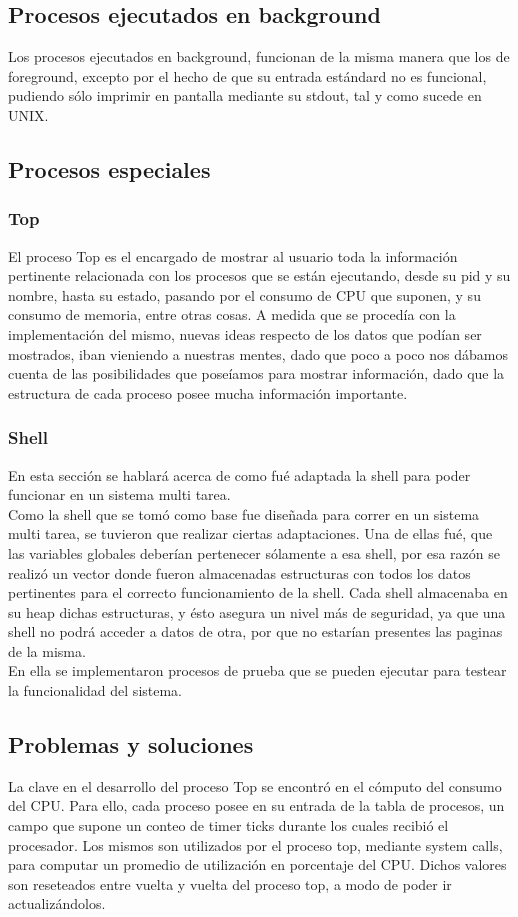 \documentclass[10pt,a4paper]{article}
\begin{document}
	\subsection{Procesos ejecutados en background}
		Los procesos ejecutados en background, funcionan de la misma manera que los de foreground, excepto por el hecho de que su entrada est\'andard no es funcional, pudiendo s\'olo imprimir en pantalla mediante su stdout, tal y como sucede en UNIX.
	\subsection{Procesos especiales}
	\subsubsection{Top}
		El proceso Top es el encargado de mostrar al usuario toda la informaci\'on pertinente relacionada con los procesos que se est\'an ejecutando, desde su pid y su nombre, hasta su estado, pasando por el consumo de CPU que suponen, y su consumo de memoria, entre otras cosas. A medida que se proced\'ia con la implementaci\'on del mismo, nuevas ideas respecto de los datos que pod\'ian ser mostrados, iban vieniendo a nuestras mentes, dado que poco a poco nos d\'abamos cuenta de las posibilidades que pose\'iamos para mostrar informaci\'on, dado que la estructura de cada proceso posee mucha informaci\'on importante. 
	\subsubsection{Shell}
	En esta secci\'on se hablar\'a acerca de como fu\'e adaptada la shell para poder funcionar en un sistema multi tarea. \\ 
	Como la shell que se tom\'o como base fue dise\~nada para correr en un sistema multi tarea, se tuvieron que realizar ciertas adaptaciones. Una de ellas fu\'e, que las variables globales deber\'ian pertenecer s\'olamente a esa shell, por esa raz\'on se realiz\'o un vector donde fueron almacenadas estructuras con todos los datos pertinentes para el correcto funcionamiento de la shell. Cada shell almacenaba en su heap dichas estructuras, y \'esto asegura un nivel m\'as de seguridad, ya que una shell no podr\'a acceder a datos de otra, por que no estar\'ian presentes las paginas de la misma. \\
	En ella se implementaron procesos de prueba que se pueden ejecutar para testear la funcionalidad del sistema.

	\subsection{Problemas y soluciones}
		La clave en el desarrollo del proceso Top se encontr\'o en el c\'omputo del consumo del CPU. Para ello, cada proceso posee en su entrada de la tabla de procesos, un campo que supone un conteo de timer ticks durante los cuales recibi\'o el procesador. Los mismos son utilizados por el proceso top, mediante system calls, para computar un promedio de utilizaci\'on en porcentaje del CPU. Dichos valores son reseteados entre vuelta y vuelta del proceso top, a modo de poder ir actualiz\'andolos.
\end{document}

